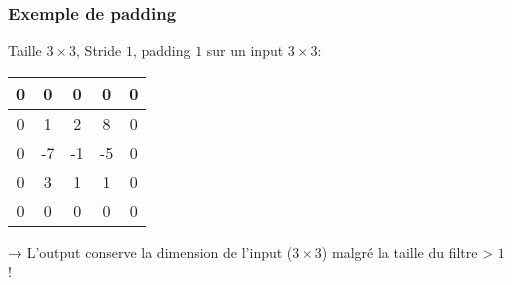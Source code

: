 \documentclass{formation}
\begin{document}
\begin{frame}
  \frametitle{Exemple de padding}
  Taille $3\times 3$, Stride $1$, padding $1$ sur un input $3 \times
  3$:
  \\[.5cm]
  \begin{tabular}{|c|c|c|c|c|}
    \hline
    0 & 0 & 0 & 0 & 0 \\
    \hline
    0 & 1 & 2 & 8 & 0 \\
    \hline
    0 & -7 & \cellcolor{green}-1 & \cellcolor{green}-5 & \cellcolor{green}0 \\
    \hline
    0 & 3 & \cellcolor{green}1 & \cellcolor{green}1 & \cellcolor{green}0 \\
    \hline
    0 & 0 & \cellcolor{green}0 & \cellcolor{green}0 & \cellcolor{green}0 \\
    \hline
  \end{tabular}

  → L'output conserve la dimension de l'input ($3 \times 3$) malgré la
  taille du filtre > $1$ !
\end{frame}
\end{document}
